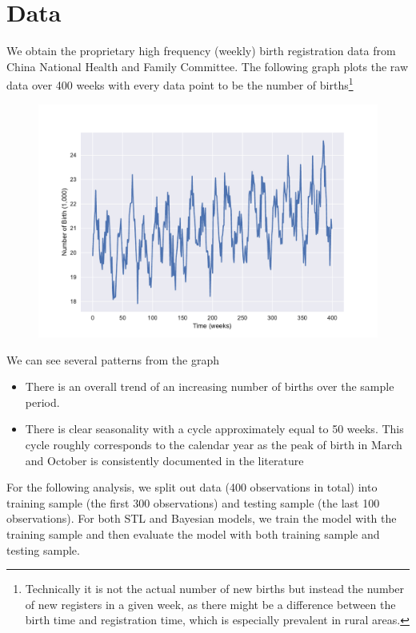\documentclass[letterpaper,12pt]{article}
\begin{document}
\section{Data}
\quad We obtain the proprietary high frequency (weekly) birth registration data from China National Health and Family Committee.  The following graph plots the raw data over 400 weeks with every data point to be the number of births\footnote{Technically it is not the actual number of new births but instead the number of new registers in a given week, as there might be a difference between the birth time and registration time, which is especially prevalent in rural areas.} 
\begin{figure}[h]
\begin{center}
\includegraphics[width=0.8\linewidth]{graph1.pdf}
\end{center}
\end{figure}
We can see several patterns from the graph
\begin{itemize}
\item There is an overall trend of an increasing number of births over the sample period.
\item There is clear seasonality with a cycle approximately equal to 50 weeks. This cycle roughly corresponds to the calendar year as the peak of birth in March and October is consistently documented in the literature \citep{bobak2001seasonality,yang2021analysing}
\end{itemize}

For the following analysis, we split out data (400 observations in total) into training sample (the first 300 observations) and testing sample (the last 100 observations). For both STL and Bayesian models, we train the model with the training sample and then evaluate the model with both training sample and testing sample.
\end{document}
